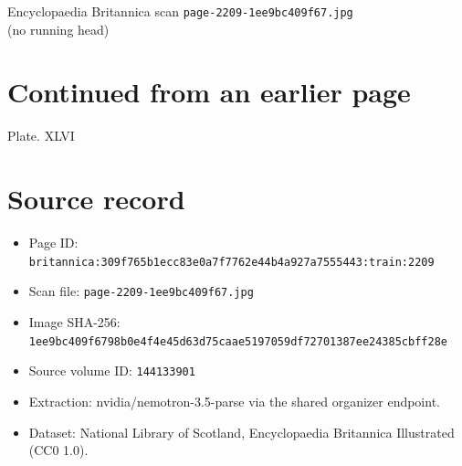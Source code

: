 \documentclass{article}
\begin{document}
\begin{center}
{\Large Encyclopaedia Britannica scan \texttt{page-2209-1ee9bc409f67.jpg}}\\[0.5em]
(no running head)
\end{center}
\section*{Continued from an earlier page}
Plate. XLVI

\section*{Source record}
\begin{itemize}
\item Page ID: \texttt{britannica:309f765b1ecc83e0a7f7762e44b4a927a7555443:train:2209}
\item Scan file: \texttt{page-2209-1ee9bc409f67.jpg}
\item Image SHA-256: \texttt{1ee9bc409f6798b0e4f4e45d63d75caae5197059df72701387ee24385cbff28e}
\item Source volume ID: \texttt{144133901}
\item Extraction: nvidia/nemotron-3.5-parse via the shared organizer endpoint.
\item Dataset: National Library of Scotland, Encyclopaedia Britannica Illustrated (CC0 1.0).
\end{itemize}
\end{document}
